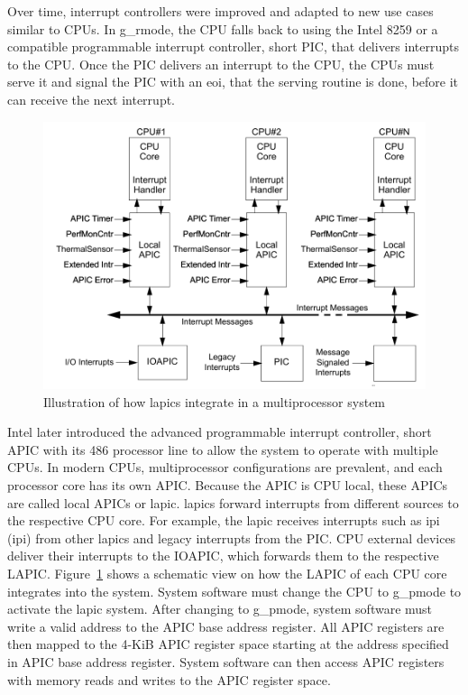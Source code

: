 Over time, interrupt controllers were improved and adapted to new use cases
similar to CPUs. In \gls{g_rmode}, the CPU falls back to using the Intel 8259 or a
compatible programmable interrupt controller, short PIC, that delivers
interrupts to the CPU. Once the PIC delivers an interrupt to the CPU, the CPUs
must serve it and signal the PIC with an \gls{eoi}, that
the serving routine is done, before it can receive the next interrupt. \\

\begin{figure}
    \begin{center}
        \includegraphics[width=.6\textwidth]{images/lapic_placeholder.png}
        \caption{Illustration of how \glspl{lapic} integrate in a
            multiprocessor system}
        \label{fig:state:technical:lapic}
    \end{center}
\end{figure}

Intel later introduced the advanced programmable interrupt controller, short
APIC with its 486 processor line to allow the system to operate with multiple
CPUs. In modern CPUs, multiprocessor configurations are prevalent, and each
processor core has its own APIC. Because the APIC is CPU local, these APICs are
called local APICs or \gls{lapic}. \glspl{lapic}
forward interrupts from different sources to the respective CPU core. For
example, the \gls{lapic} receives interrupts such as \gls{ipi}
(\gls{ipi}) from other \glspl{lapic} and legacy interrupts from the
PIC. CPU external devices deliver their interrupts to the IOAPIC, which
forwards them to the respective LAPIC. Figure~\ref{fig:state:technical:lapic}
shows a schematic view on how the LAPIC of each CPU core integrates into the
system. System software must change the CPU to \gls{g_pmode} to activate the
\gls{lapic} system. After changing to \gls{g_pmode}, system software must
write a valid address to the APIC base address register. All APIC registers are
then mapped to the 4-KiB APIC register space starting at the address specified
in APIC base address register. System software can then access APIC registers
with memory reads and writes to the APIC register space.

